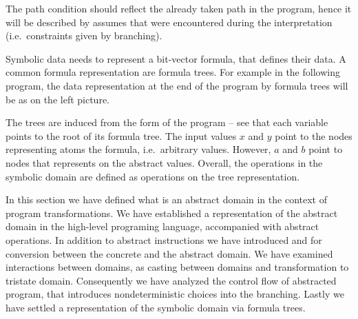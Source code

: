 The path condition should reflect the already taken path in the program, hence
it will be described by assumes that were encountered during the interpretation
(i.e.~constraints given by branching).

Symbolic data needs to represent a bit-vector formula, that defines their data.
A common formula representation are formula trees. For example in the following
program, the data representation at the end of the program by formula trees will
be as on the left picture.

\bigskip
\noindent
{}
\hfill
{}

The trees are induced from the \SSA form of the program -- see that each
variable points to the root of its formula tree. The input values $x$ and $y$
point to the nodes representing atoms the formula, i.e.~arbitrary values.
However, $a$ and $b$ point to nodes that represents on the abstract values.
Overall, the operations in the symbolic domain are defined as operations on
the tree representation.

\begin{summary}
In this section we have defined what is an abstract domain in the context of program
transformations. We have established a representation of the abstract domain in
the high-level programing language, accompanied with abstract operations. In
addition to abstract \LLVM instructions we have introduced  and
 for conversion between the concrete and the abstract domain. We have
examined interactions between domains, as casting between domains and
transformation to tristate domain. Consequently we have analyzed the control flow
of abstracted program, that introduces nondeterministic choices into the
branching. Lastly we have settled a representation of the symbolic domain via formula
trees.
\end{summary}

